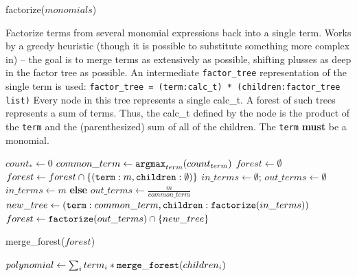 \documentclass[11pt]{amsart}
\begin{document}
\begin{algorithm}
\caption{factorize($monomials$)}
Factorize terms from several monomial expressions back into a single term.  Works by a greedy heuristic (though it is possible to substitute something more complex in) -- the goal is to merge terms as extensively as possible, shifting plusses as deep in the factor tree as possible.  An intermediate {\tt factor\_tree} representation of the single term is used: 
{\tt \noindent factor\_tree = (term:calc\_t) * (children:factor\_tree list)}
\noindent Every node in this tree represents a single calc\_t.  A forest of such trees represents a sum of terms.  Thus, the calc\_t defined by the node is the product of the {\tt term} and the (parenthesized) sum of all of the children.  The {\tt term} {\bf must} be a monomial.
\begin{algorithmic}[1]
\STATE $count_{*} \gets 0$
  \ENDFOR
\ENDFOR
\STATE $common\_term \gets {\tt argmax}_{term}(count_{term})$
  \STATE $forest \gets \emptyset$
    \STATE $forest \gets forest \cap \{({\tt term}:m, {\tt children}:\emptyset)\}$
  \ENDFOR
\ELSE
  \STATE $in\_terms \gets \emptyset$; $out\_terms \gets \emptyset$
      \STATE $in\_terms \gets m$ {\bf else} $out\_terms \gets \frac{m}{common\_term}$
    \ENDIF
  \ENDFOR
  \STATE $new\_tree \gets ({\tt term}:common\_term, {\tt children}:{\tt factorize}(in\_terms))$
  \STATE $forest \gets {\tt factorize}(out\_terms) \cap \{new\_tree\}$
\ENDIF
\end{algorithmic}
\end{algorithm}

\begin{algorithm}
\caption{merge\_forest($forest$)}
\label{alg:dbtoaster:mergeForest}
\begin{algorithmic}
\STATE $polynomial \gets \sum_i term_i * {\tt merge\_forest}(children_i)$
\end{algorithmic}
\end{algorithm}
\end{document}
